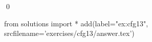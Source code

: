 
\begin{ex} 
  \label{ex:cfg13}
  
  \qed
\end{ex} 
\begin{python0}
from solutions import *
add(label="ex:cfg13",
    srcfilename='exercises/cfg13/answer.tex') 
\end{python0}
